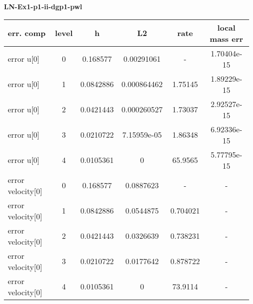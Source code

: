\documentclass{amsart}
\begin{document}
\begin{center}   
{\bf LN-Ex1-p1-ii-dgp1-pwl }\end{center}  
\tableofcontents

\begin{table}[h!]
\begin{tabular}{|l|c|c|c|c|c|}
\hline
err. comp & level & h  & L2 & rate  & local mass err \\ 
\hline
error u[0] & 0 & 0.168577  & 0.00291061  & -   &  1.70404e-15 \\ 
error u[0] & 1 & 0.0842886 & 0.000864462 & 1.75145   &  1.89229e-15 \\ 
error u[0] & 2 & 0.0421443 & 0.000260527 & 1.73037   &  2.92527e-15 \\ 
error u[0] & 3 & 0.0210722 & 7.15959e-05 & 1.86348   &  6.92336e-15 \\ 
error u[0] & 4 & 0.0105361 & 0 & 65.9565   &  5.77795e-15 \\ 
error velocity[0] & 0 & 0.168577  & 0.0887623 & -   & - \\ 
error velocity[0] & 1 & 0.0842886 & 0.0544875 & 0.704021   & - \\ 
error velocity[0] & 2 & 0.0421443 & 0.0326639 & 0.738231   & - \\ 
error velocity[0] & 3 & 0.0210722 & 0.0177642 & 0.878722   & - \\ 
error velocity[0] & 4 & 0.0105361 & 0 & 73.9114   & - \\ 

\hline
\end{tabular}
\end{table}
\end{document}
